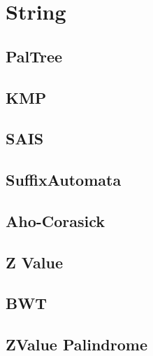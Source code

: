 \documentclass[a4paper,10pt,twocolumn,oneside]{article}
\begin{document}
% 

\section{String}
\subsection{PalTree}


%

\subsection{KMP}


\subsection{SAIS}


\subsection{SuffixAutomata}


\subsection{Aho-Corasick}


\subsection{Z Value}


\subsection{BWT}


\subsection{ZValue Palindrome}

\end{document}
